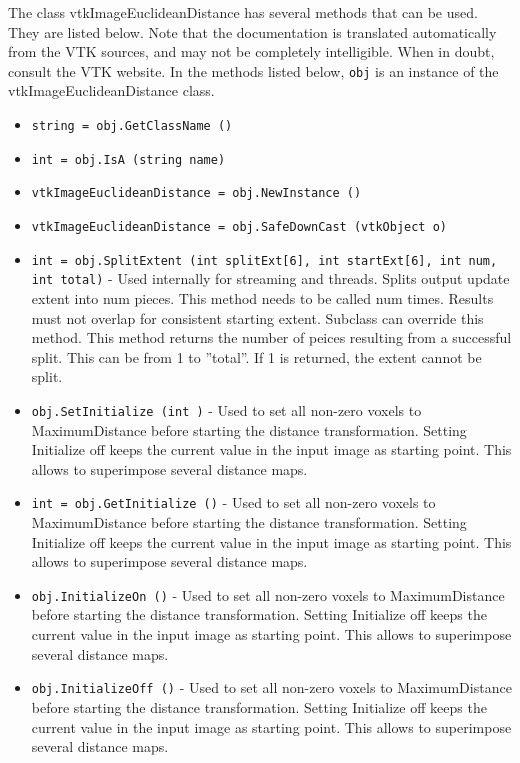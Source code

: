 The class vtkImageEuclideanDistance has several methods that can be used.
  They are listed below.
Note that the documentation is translated automatically from the VTK sources,
and may not be completely intelligible.  When in doubt, consult the VTK website.
In the methods listed below, \verb|obj| is an instance of the vtkImageEuclideanDistance class.
\begin{itemize}
\item  \verb|string = obj.GetClassName ()|

\item  \verb|int = obj.IsA (string name)|

\item  \verb|vtkImageEuclideanDistance = obj.NewInstance ()|

\item  \verb|vtkImageEuclideanDistance = obj.SafeDownCast (vtkObject o)|

\item  \verb|int = obj.SplitExtent (int splitExt[6], int startExt[6], int num, int total)| -  Used internally for streaming and threads.  
 Splits output update extent into num pieces.
 This method needs to be called num times.  Results must not overlap for
 consistent starting extent.  Subclass can override this method.
 This method returns the number of peices resulting from a
 successful split.  This can be from 1 to ''total''.  
 If 1 is returned, the extent cannot be split.

\item  \verb|obj.SetInitialize (int )| -  Used to set all non-zero voxels to MaximumDistance before starting
 the distance transformation. Setting Initialize off keeps the current 
 value in the input image as starting point. This allows to superimpose 
 several distance maps. 

\item  \verb|int = obj.GetInitialize ()| -  Used to set all non-zero voxels to MaximumDistance before starting
 the distance transformation. Setting Initialize off keeps the current 
 value in the input image as starting point. This allows to superimpose 
 several distance maps. 

\item  \verb|obj.InitializeOn ()| -  Used to set all non-zero voxels to MaximumDistance before starting
 the distance transformation. Setting Initialize off keeps the current 
 value in the input image as starting point. This allows to superimpose 
 several distance maps. 

\item  \verb|obj.InitializeOff ()| -  Used to set all non-zero voxels to MaximumDistance before starting
 the distance transformation. Setting Initialize off keeps the current 
 value in the input image as starting point. This allows to superimpose 
 several distance maps. 


\end{itemize}
